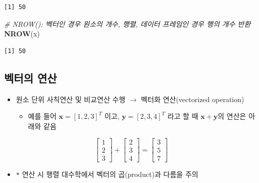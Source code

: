 \documentclass[
  11pt,
]{krantz}
\newenvironment{Shaded}{\begin{snugshade}}{\end{snugshade}}
\newcommand{\CommentTok}[1]{\textcolor[rgb]{0.37,0.37,0.37}{\textit{#1}}}
\newcommand{\KeywordTok}[1]{\textcolor[rgb]{0.27,0.27,0.27}{\textbf{#1}}}
\newcommand{\NormalTok}[1]{#1}
\providecommand{\tightlist}{%
  \setlength{\itemsep}{0pt}\setlength{\parskip}{0pt}}
\begin{document}
\begin{verbatim}
[1] 50
\end{verbatim}

\begin{Shaded}
\begin{Highlighting}[]
\CommentTok{# NROW(): 벡터인 경우 원소의 개수, 행렬, 데이터 프레임인 경우 행의 개수 반환}
\KeywordTok{NROW}\NormalTok{(x)}
\end{Highlighting}
\end{Shaded}

\begin{verbatim}
[1] 50
\end{verbatim}

\normalsize

\hypertarget{vector-operation}{%
\subsection{벡터의 연산}\label{vector-operation}}

\begin{itemize}
\tightlist
\item
  원소 단위 사칙연산 및 비교연산 수행 \(\rightarrow\) 벡터화 연산(vectorized operation)

  \begin{itemize}
  \tightlist
  \item
    예를 들어 \(\mathrm{\mathbf x} = [1, 2, 3]^T\) 이고, \(\mathrm{\mathbf y} = [2, 3, 4]^T\) 라고 할 때 \(\mathrm{\mathbf x} + \mathrm{\mathbf y}\)의 연산은 아래와 같음
  \end{itemize}
\end{itemize}

\[\begin{bmatrix}
1 \\ 2\\ 3
\end{bmatrix} + 
\begin{bmatrix}
2 \\ 3\\ 4
\end{bmatrix} = 
\begin{bmatrix}
3 \\ 5 \\ 7
\end{bmatrix}
\]

\begin{itemize}
\tightlist
\item
  \texttt{*} 연산 시 행렬 대수학에서 벡터의 곱(product)과 다름을 주의
\end{itemize}
\end{document}
